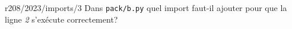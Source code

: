 \begin{question}{r208/2023/imports/3}
  Dans \texttt{pack/b.py} quel import faut-il ajouter pour que la
  ligne {\em 2} s'exécute correctement?
  \begin{reponses}
  \end{reponses}
\end{question}
